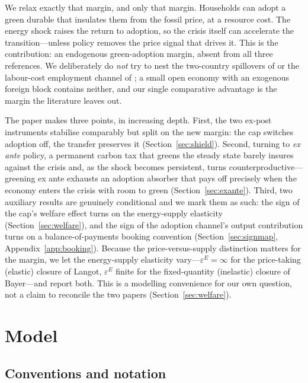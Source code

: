 \documentclass[11pt,a4paper]{article}
\begin{document}
We relax exactly that margin, and only that margin. Households can adopt a green
durable that insulates them from the fossil price, at a resource cost. The energy
shock raises the return to adoption, so the crisis itself can accelerate the
transition---unless policy removes the price signal that drives it. This is the
contribution: an endogenous green-adoption margin, absent from all three
references. We deliberately do \emph{not} try to nest the two-country spillovers
of \citet{Bayer2026} or the labour-cost employment channel of \citet{Langot2026};
a small open economy with an exogenous foreign block contains neither, and our
single comparative advantage is the margin the literature leaves out.

The paper makes three points, in increasing depth. First, the two ex-post
instruments stabilise comparably but split on the new margin: the cap switches
adoption off, the transfer preserves it (Section~\ref{sec:shield}). Second,
turning to \emph{ex ante} policy, a permanent carbon tax that greens the steady
state barely insures against the crisis and, as the shock becomes persistent,
turns counterproductive---greening ex ante exhausts an adoption absorber that
pays off precisely when the economy enters the crisis with room to green
(Section~\ref{sec:exante}). Third, two auxiliary results are genuinely
conditional and we mark them as such: the sign of the cap's welfare effect turns
on the energy-supply elasticity (Section~\ref{sec:welfare}), and the sign of the
adoption channel's output contribution turns on a balance-of-payments booking
convention (Section~\ref{sec:signmap}, Appendix~\ref{app:booking}). Because the
price-versus-supply distinction matters for the margin, we let the energy-supply
elasticity vary---$\varepsilon^{E}=\infty$ for the price-taking (elastic) closure
of Langot, $\varepsilon^{E}$ finite for the fixed-quantity (inelastic) closure of
Bayer---and report both. This is a modelling convenience for our own question,
not a claim to reconcile the two papers (Section~\ref{sec:welfare}).

\section{Model}\label{sec:model}

\subsection{Conventions and notation}
\end{document}
